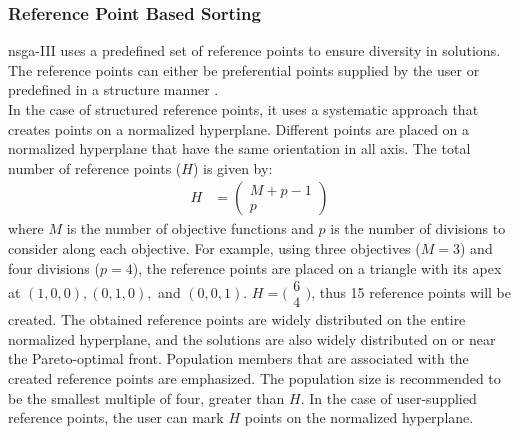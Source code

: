 \subsubsection{Reference Point Based Sorting}
\Gls{nsga}-III uses a predefined set of reference points to ensure diversity in solutions. The reference points can either be preferential points supplied by the user or predefined in a structure manner \parencite{Deb2013AnConstraints}. \\ 
In the case of structured reference points, it uses a systematic approach that creates points on a normalized hyperplane. Different points are placed on a
normalized hyperplane that have the same orientation in
all axis. The total number of reference points ($H$) is given by:
\begin{align*}
    H &= \begin{pmatrix}
    M + p - 1 \\
    p
    \end{pmatrix}
\end{align*}
where $M$ is the number of objective functions and $p$ is the number of divisions to consider along each objective. For example, using three objectives ($M = 3$) and four divisions ($p = 4$), the reference points are placed on a triangle with its apex at $(1,0,0), (0,1,0),$ and $(0,0,1)$. $H = \big(\begin{smallmatrix}
  6\\
  4
\end{smallmatrix}\big)$, thus 15 reference points will be created. The obtained reference points are widely distributed on the entire normalized hyperplane, and the solutions are also widely distributed on or near the Pareto-optimal front. Population members that are associated with the created reference points are emphasized. The population size is recommended to be the smallest multiple of four, greater than $H$. In the case of user-supplied reference points, the user can mark $H$ points on the normalized hyperplane.

